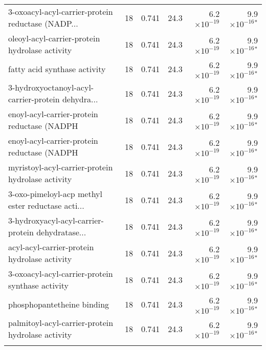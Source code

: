 \begin{longtable}{|l|r|r|r|r|r|}
 3-oxoacyl-acyl-carrier-protein reductase (NADP... &                      18 &                   0.741 &       24.3 & 6.2$\times 10^{-19}$ &  9.9$\times 10^{-16}$$\bm{^*}$ \\
    oleoyl-acyl-carrier-protein hydrolase activity &                      18 &                   0.741 &       24.3 & 6.2$\times 10^{-19}$ &  9.9$\times 10^{-16}$$\bm{^*}$ \\
                      fatty acid synthase activity &                      18 &                   0.741 &       24.3 & 6.2$\times 10^{-19}$ &  9.9$\times 10^{-16}$$\bm{^*}$ \\
 3-hydroxyoctanoyl-acyl-carrier-protein dehydra... &                      18 &                   0.741 &       24.3 & 6.2$\times 10^{-19}$ &  9.9$\times 10^{-16}$$\bm{^*}$ \\
       enoyl-acyl-carrier-protein reductase (NADPH &                      18 &                   0.741 &       24.3 & 6.2$\times 10^{-19}$ &  9.9$\times 10^{-16}$$\bm{^*}$ \\
       enoyl-acyl-carrier-protein reductase (NADPH &                      18 &                   0.741 &       24.3 & 6.2$\times 10^{-19}$ &  9.9$\times 10^{-16}$$\bm{^*}$ \\
 myristoyl-acyl-carrier-protein hydrolase activity &                      18 &                   0.741 &       24.3 & 6.2$\times 10^{-19}$ &  9.9$\times 10^{-16}$$\bm{^*}$ \\
 3-oxo-pimeloyl-acp methyl ester reductase acti... &                      18 &                   0.741 &       24.3 & 6.2$\times 10^{-19}$ &  9.9$\times 10^{-16}$$\bm{^*}$ \\
 3-hydroxyacyl-acyl-carrier-protein dehydratase... &                      18 &                   0.741 &       24.3 & 6.2$\times 10^{-19}$ &  9.9$\times 10^{-16}$$\bm{^*}$ \\
      acyl-acyl-carrier-protein hydrolase activity &                      18 &                   0.741 &       24.3 & 6.2$\times 10^{-19}$ &  9.9$\times 10^{-16}$$\bm{^*}$ \\
  3-oxoacyl-acyl-carrier-protein synthase activity &                      18 &                   0.741 &       24.3 & 6.2$\times 10^{-19}$ &  9.9$\times 10^{-16}$$\bm{^*}$ \\
                        phosphopantetheine binding &                      18 &                   0.741 &       24.3 & 6.2$\times 10^{-19}$ &  9.9$\times 10^{-16}$$\bm{^*}$ \\
 palmitoyl-acyl-carrier-protein hydrolase activity &                      18 &                   0.741 &       24.3 & 6.2$\times 10^{-19}$ &  9.9$\times 10^{-16}$$\bm{^*}$ \\
$$
\end{longtable}
